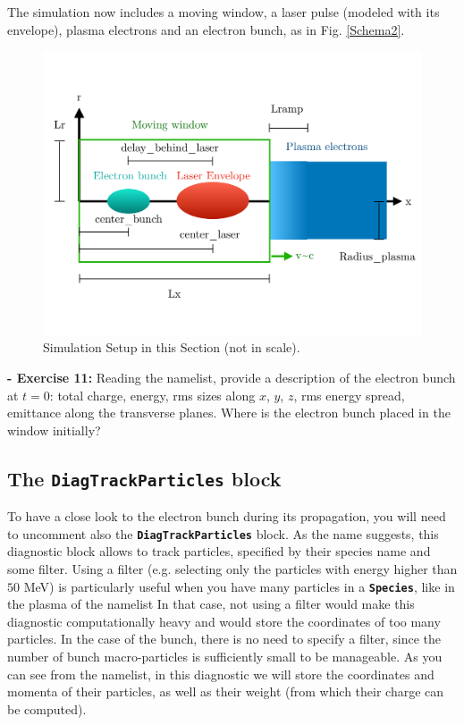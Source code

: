 \documentclass{article}
\newcommand{\commandline}[1]{\texttt{\textbf{#1}}}
\begin{document}
The simulation now includes a moving window, a laser pulse (modeled with its envelope), plasma electrons and an electron bunch, as in Fig. \ref{Schema2}.\\

\begin{figure}[h!]
  \begin{center}
  \includegraphics[scale=0.3]{Schema_Simulation_3.pdf}
  \end{center}
  \caption{Simulation Setup in this Section (not in scale).}
  \label{Schema3}
\end{figure}

\textbf{ - Exercise 11:} Reading the namelist, provide a description of the electron bunch at $t=0$: total charge, energy, rms sizes along $x$, $y$, $z$, rms energy spread, emittance  along the transverse planes. Where is the electron bunch placed in the window initially? \\

\subsection*{The \commandline{DiagTrackParticles} block}
To have a close look to the electron bunch during its propagation,  you will need to uncomment also the \commandline{DiagTrackParticles} block. As the name suggests, this diagnostic block allows to track particles, specified by their species name and some filter. Using a filter (e.g. selecting only the particles with energy higher than $50$ MeV) is particularly useful when you have many particles in a \commandline{Species}, like in the plasma of the namelist In that case, not using a filter would make this diagnostic computationally heavy and would store the coordinates of too many particles. In the case of the bunch, there is no need to specify a filter, since the number of bunch macro-particles is sufficiently small to be manageable. As you can see from the namelist, in this diagnostic we will store the coordinates and momenta of their particles, as well as their weight (from which their charge can be computed). \\
\end{document}

